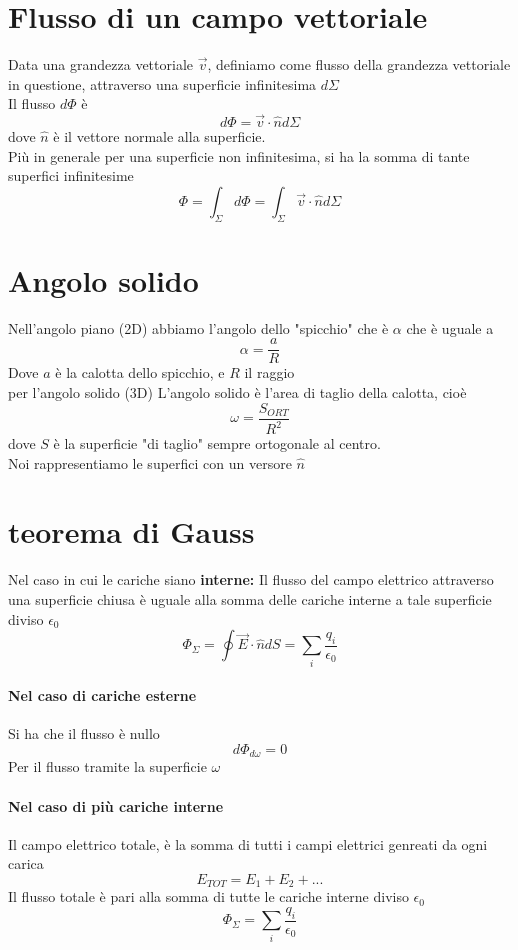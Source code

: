 \documentclass[a4paper]{report}
\begin{document}
  \section{Flusso di un campo vettoriale}
  Data una grandezza vettoriale $\vec{v}$,  definiamo come flusso della grandezza vettoriale in questione, attraverso una superficie infinitesima $d \Sigma$\\
  Il flusso $d \Phi$ è
  $$ d \Phi = \vec{v}\cdot \hat{n} d \Sigma $$
  dove $\hat{n}$ è il vettore normale alla superficie.\\
  Più in generale per una superficie non infinitesima, si ha la somma di tante superfici infinitesime
  $$ \Phi = \int_\Sigma d\Phi = \int_\Sigma \vec{v} \cdot \hat{n} d\Sigma $$


  \section{Angolo solido}
  Nell'angolo piano (2D) abbiamo l'angolo dello "spicchio" che è $\alpha$ che è uguale a
  $$\alpha = \frac{a}{R}$$
  Dove $a$ è la calotta dello spicchio, e $R$ il raggio\\
  per l'angolo solido (3D)
  L'angolo solido è l'area di taglio della calotta, cioè
  $$ \omega = \frac{S_{ORT}}{R^2} $$
  dove $S$ è la superficie "di taglio" sempre ortogonale al centro.\\
  Noi rappresentiamo le superfici con un versore $\hat{n}$


  \section{teorema di Gauss}
  Nel caso in cui le cariche siano \textbf{interne:}
  Il flusso del campo elettrico attraverso una superficie chiusa è uguale alla somma delle cariche interne a tale superficie diviso $\epsilon_0$
  $$ \Phi_{\Sigma} = \oint \vec{E} \cdot \hat{n} dS = \sum_i \frac{q_i}{\epsilon_0} $$
  \paragraph{Nel caso di cariche esterne}
  Si ha che il flusso è nullo
  $$ d\Phi_{d\omega} = 0$$
  Per il flusso tramite la superficie $\omega$
  \paragraph{Nel caso di più cariche interne}
  Il campo elettrico totale, è la somma di tutti i campi elettrici genreati da ogni carica
  $$E_{TOT} = E_1 + E_2 + ...$$
  Il flusso totale è pari alla somma di tutte le cariche interne diviso $\epsilon_0$
  $$ \Phi_{\Sigma} = \sum_i \frac{q_i}{\epsilon_0} $$
\end{document}
